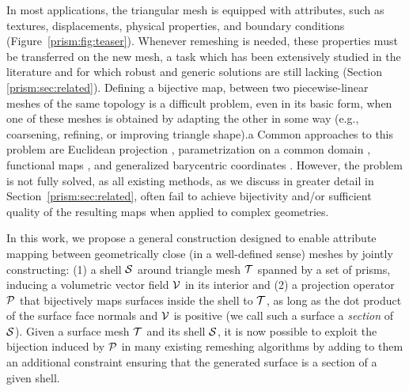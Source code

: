 In most applications, the triangular mesh is equipped with attributes, such as textures, displacements, physical properties, and boundary conditions (Figure~\ref{prism:fig:teaser}). Whenever remeshing is needed, these properties must be transferred on the new mesh, a task which has been extensively studied in the literature and for which robust and generic solutions are still lacking (Section \ref{prism:sec:related}). 
Defining a  bijective map,  between two   piecewise-linear meshes of the same topology is a difficult problem, even in its basic form, when one of these meshes is obtained by adapting the other in some way (e.g., coarsening, refining, or improving triangle shape).a
Common approaches to this problem are Euclidean projection
\cite{jiao2004overlaying}, parametrization on a common domain \cite{praun2001consistent,kraevoy2004cross,lee1998maps}, functional maps \cite{Ovsjanikov:2012}, and generalized barycentric coordinates \cite{Hormann:2017:GBC}.  However, the problem is not fully solved, as all existing methods, as we discuss in greater detail in Section~\ref{prism:sec:related},
 often fail to achieve bijectivity and/or sufficient quality of the resulting maps when applied to complex geometries. %

In this work, we propose a general construction designed to enable attribute mapping between geometrically close (in a well-defined sense) meshes by jointly constructing: (1) a shell $\S$ around triangle mesh $\T$ spanned by a set of prisms, inducing a volumetric vector field $\V$ in its interior and (2) a projection operator $\P$ that bijectively maps surfaces inside the shell to $\T$, as long as the dot product of the surface face normals and $\V$ is positive
(we call such a surface a \emph{section} of $\S$).
Given a surface mesh $\T$ and its shell $\S$, it is now possible to exploit the bijection induced by $\P$ in many existing remeshing algorithms by adding to them an additional constraint ensuring that the generated surface is a section of a given shell.

